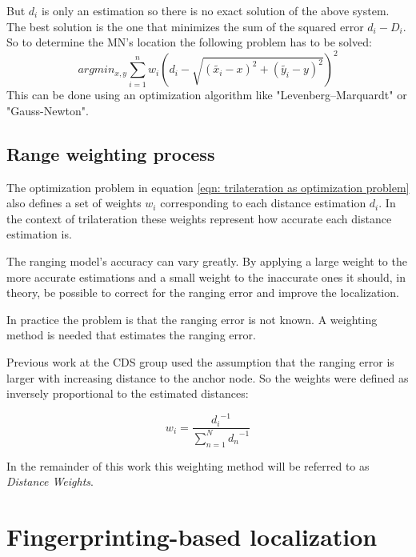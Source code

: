 But \(d_{i}\) is only an estimation so there is no exact solution of the above system. The best solution is the one that minimizes the sum of the squared error \(d_{i} - D_{i}\). So to determine the MN's location the following problem has to be solved:
\begin{equation}
argmin_{x,y}\sum_{i=1}^{n}w_{i}\left ( d_{i} - \sqrt{\left ( \tilde{x_{i}}-x \right )^{2}+\left ( \tilde{y_{i}}-y \right )^{2}} \right )^{2}
\label{eqn: trilateration as optimization problem}
\end{equation}
This can be done using an optimization algorithm like "Levenberg–Marquardt" or "Gauss-Newton".

\subsection{Range weighting process}

The optimization problem in equation \ref{eqn: trilateration as optimization problem} also defines a set of weights $w_i$ corresponding to each distance estimation $d_i$. In the context of trilateration these weights represent how accurate each distance estimation is.

The ranging model's accuracy can vary greatly. By applying a large weight to the more accurate estimations and a small weight to the inaccurate ones it should, in theory, be possible to correct for the ranging error and improve the localization.

In practice the problem is that the ranging error is not known. A weighting method is needed that estimates the ranging error.

Previous work at the CDS group \cite{FineGrainedIndoorTracking} used the assumption that the ranging error is larger with increasing distance to the anchor node. So the weights were defined as inversely proportional to the estimated distances:

\begin{equation}
w_{i}=\frac{{d_i}^{-1}}{\sum_{n=1}^{N}{d_n}^{-1}}
\label{eqn: distance weights}
\end{equation}

In the remainder of this work this weighting method will be referred to as \emph{Distance Weights}.

\section{Fingerprinting-based localization}

